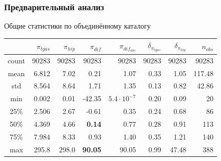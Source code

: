 \documentclass[12pt,aspectratio=43]{beamer}
\begin{document}
\begin{frame}[<alignment>]
\begin{figure}[H]
\begin{minipage}[h]{0.47\linewidth}
\end{minipage}
\hfill
\begin{minipage}[h]{0.47\linewidth}
\end{minipage}
\end{figure}
\end{frame}

\begin{frame}[squeeze, shrink=5]
\frametitle{Предварительный анализ}
Общие статистики по объединённому каталогу
\begin{table}[h!]
\label{tabular:tgas_st}
\begin{tabular}{c|r|r|r|r|r|r|r}
\hline 	
&$\pi_{tgas}$&$\pi_{hip}$&$\pi_{dif}$&$\pi_{dif_{abs}}$&$\delta_{\pi_{tgas}}$&$\delta_{\pi_{hip}}$&$n_{obs}$\\
\hline
\hline 	
count&90283&90283&90283&90283&90283&90283&90283\\
\hline 
mean&6.812&7.02&0.21&1.07&0.33&1.05&117.48\\
std&8.564&8.64&1.71&1.35&0.13&0.82&42.86\\
min&0.002&0.01&-42.35&$5.4\cdot10^{-7}$&0.20&0.09&20\\
25\%&2.506&2.67&-0.61&0.35&0.24&0.68&86\\
50\%&4.369&4.66&\textbf{0.14}&0.77&0.28&0.91&113\\
75\%&7.984&8.33&0.93&1.40&0.35&1.21&140\\
max&295.8&298.0&\textbf{90.05}&90.05&0.99&47.48&388\\
\end{tabular}
\end{table}

\end{frame}	

\end{document}
